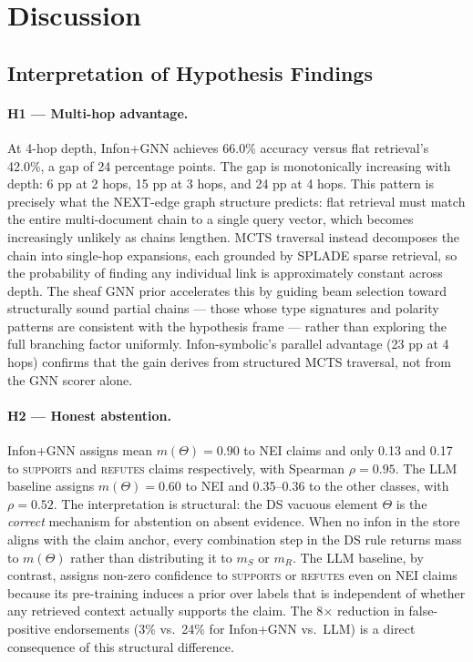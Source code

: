 \section{Discussion}
\label{sec:discussion}

\subsection{Interpretation of Hypothesis Findings}
\label{sec:discussion:interpretation}

\paragraph{H1 — Multi-hop advantage.}
At 4-hop depth, Infon+GNN achieves 66.0\% accuracy versus flat retrieval's
42.0\%, a gap of 24 percentage points.  The gap is monotonically increasing
with depth: 6 pp at 2 hops, 15 pp at 3 hops, and 24 pp at 4 hops.  This
pattern is precisely what the NEXT-edge graph structure predicts: flat
retrieval must match the entire multi-document chain to a single query
vector, which becomes increasingly unlikely as chains lengthen.  MCTS
traversal instead decomposes the chain into single-hop expansions, each
grounded by SPLADE sparse retrieval, so the probability of finding any
individual link is approximately constant across depth.  The sheaf GNN
prior accelerates this by guiding beam selection toward structurally sound
partial chains — those whose type signatures and polarity patterns are
consistent with the hypothesis frame — rather than exploring the full
branching factor uniformly.  Infon-symbolic's parallel advantage (23 pp
at 4 hops) confirms that the gain derives from structured MCTS traversal,
not from the GNN scorer alone.

\paragraph{H2 — Honest abstention.}
Infon+GNN assigns mean $m(\Theta) = 0.90$ to NEI claims and only 0.13
and 0.17 to \textsc{supports} and \textsc{refutes} claims respectively, with
Spearman $\rho = 0.95$.  The LLM baseline assigns $m(\Theta) = 0.60$ to NEI
and 0.35--0.36 to the other classes, with $\rho = 0.52$.  The interpretation
is structural: the DS vacuous element $\Theta$ is the \emph{correct}
mechanism for abstention on absent evidence.  When no infon in the store
aligns with the claim anchor, every combination step in the DS rule returns
mass to $m(\Theta)$ rather than distributing it to $m_S$ or $m_R$.  The LLM
baseline, by contrast, assigns non-zero confidence to \textsc{supports} or
\textsc{refutes} even on NEI claims because its pre-training induces a prior
over labels that is independent of whether any retrieved context actually
supports the claim.  The 8$\times$ reduction in false-positive endorsements
(3\% vs.\ 24\% for Infon+GNN vs.\ LLM) is a direct consequence of this
structural difference.


